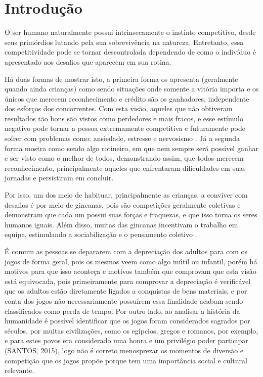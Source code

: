 
\chapter[Introdução]{Introdução}

O ser humano naturalmente possui intrinsecamente o instinto competitivo, desde seus primórdios lutando pela sua sobrevivência na natureza. Entretanto, essa competitividade pode se tornar descontrolada dependendo de como o indivíduo é apresentado aos desafios que aparecem em sua rotina.

Há duas formas de mostrar isto, a primeira forma os apresenta (geralmente quando ainda crianças) como sendo situações onde somente a vitória importa e os únicos que merecem reconhecimento e crédito são os ganhadores, independente dos esforços dos concorrentes. Com esta visão, aqueles que não obtiveram resultados tão bons são vistos como perdedores e mais fracos, e esse estímulo negativo pode tornar a pessoa extremamente competitiva e futuramente pode sofrer com problemas como: ansiedade, estresse e nervosismo  . Já a segunda forma mostra como sendo algo rotineiro, em que nem sempre será possível ganhar e ser visto como o melhor de todos, demonstrando assim, que todos merecem reconhecimento, principalmente aqueles que enfrentaram dificuldades em suas jornadas e persistiram em concluir.

Por isso, um dos meio de habituar, principalmente as crianças, a conviver com desafios é por meio de gincanas, pois são competições geralmente coletivas e demonstram que cada um possui suas forças e fraquezas, e que isso torna os seres humanos iguais. Além disso, muitas das gincanas incentivam o trabalho em equipe, estimulando a sociabilização e o pensamento coletivo .

É comum as pessoas se depararem com a depreciação dos adultos para com os jogos de forma geral, pois os mesmos veem como algo inútil ou infantil, porém há motivos para que isso aconteça e motivos também que comprovam que esta visão está equivocada, pois primeiramente para comprovar a depreciação é verificável que os adultos estão diretamente ligados a conquistas de bens materiais, e por conta dos jogos não necessariamente possuírem essa finalidade acabam sendo classificados como perda de tempo. Por outro lado, ao analisar a história da humanidade é possível identificar que os jogos foram considerados sagrados por séculos, por muitas civilizações, como os egípcios, gregos e romanos, por exemplo, e para estes povos era considerado uma honra e um privilégio poder participar (SANTOS, 2015), logo não é correto menosprezar os momentos de diversão e competição que os jogos propõe porque tem uma importância social e cultural relevante.


